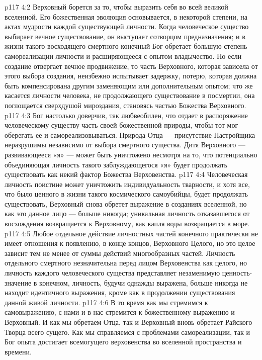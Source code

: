 \vs p117 4:2 Верховный борется за то, чтобы выразить себя во всей великой вселенной. Его божественная эволюция основывается, в некоторой степени, на актах мудрости каждой существующей личности. Когда человеческое существо выбирает вечное существование, он выступает сотворцом предназначения; и в жизни такого восходящего смертного конечный Бог обретает большую степень самореализации личности и расширяющееся с опытом владычество. Но если создание отвергает вечное продвижение, то часть Верховного, которая зависела от этого выбора создания, неизбежно испытывает задержку, потерю, которая должна быть компенсирована другим заменяющим или дополнительным опытом; что же касается личности человека, не продолжающего существование в посмертии, она поглощается сверхдушой мироздания, становясь частью Божества Верховного.
\vs p117 4:3 Бог настолько доверчив, так любвеобилен, что отдает в распоряжение человеческому существу часть своей божественной природы, чтобы тот мог оберегать ее и самореализовываться. Природа Отца --- присутствие Настройщика неразрушимы независимо от выбора смертного существа. Дитя Верховного --- развивающееся «я» --- может быть уничтожено несмотря на то, что потенциально объединяющая личность такого заблуждающегося «я» будет продолжать существовать как некий фактор Божества Верховенства.
\vs p117 4:4 Человеческая личность поистине может уничтожить индивидуальность тварности, и хотя все, что было ценного в жизни такого космического самоубийцы, будет продолжать существовать,  Верховный снова обретет выражение в созданиях вселенной, но как это данное лицо --- больше никогда; уникальная личность отказавшегося от восхождения возвращается к Верховному, как капля воды возвращается в море.
\vs p117 4:5 Любое отдельное действие личностных частей конечного практически не имеет отношения к появлению, в конце концов, Верховного Целого, но это целое зависит тем не менее от суммы действий многообразных частей. Личность отдельного смертного незначительна перед лицом Верховенства как целого, но личность каждого человеческого существа представляет незаменимую ценность\hyp{}значение в конечном, личность, будучи однажды выражена, больше никогда не находит идентичного выражения, кроме как в продолжении существования данной живой личности.
\vs p117 4:6 В то время как мы стремимся к самовыражению, с нами и в нас стремится к божественному выражению и Верховный. И как мы обретаем Отца, так и Верховный вновь обретает Райского Творца всего сущего. Как мы справляемся с проблемами самореализации, так и Бог опыта достигает всемогущего верховенства во вселенной пространства и времени.

